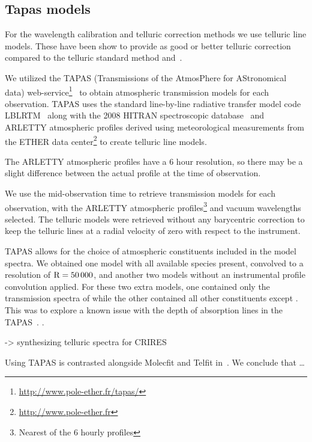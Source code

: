 \subsection{Tapas models}
\label{subsec:tapas_models}
For the wavelength calibration and telluric correction methods we use telluric line models.
These have been show to provide as good or better telluric correction compared to the telluric standard method and~\citep{ulmer-moll_telluric_2018}.

We utilized the {TAPAS} (Transmissions of the AtmosPhere for AStronomical data) web-service\footnote{\href{http://www.pole-ether.fr/tapas/}{http://www.pole-ether.fr/tapas/}}~\citep{bertaux_tapas_2014} to obtain atmospheric transmission models for each observation. {TAPAS} uses the standard line-by-line radiative transfer model code LBLRTM~\citep{clough_linebyline_1995} along with the 2008 {HITRAN} spectroscopic database~\citep{rothman_hitran_2009} and {ARLETTY} atmospheric profiles derived using meteorological measurements from the {ETHER} data center\footnote{\href{http://www.pole-ether.fr}{http://www.pole-ether.fr}} to create telluric line models.

The {ARLETTY} atmospheric profiles have a 6 hour resolution, so there may be a slight difference between the actual profile at the time of observation.

We use the mid-observation time to retrieve transmission models for each observation, with the {ARLETTY} atmospheric profiles\footnote{Nearest of the 6 hourly profiles} and vacuum wavelengths selected.
The telluric models were retrieved without any barycentric correction to keep the telluric lines at a radial velocity of zero with respect to the instrument.

{TAPAS} allows for the choice of atmospheric constituents included in the model spectra.
We obtained one model with all available species present, convolved to a resolution of \(\rm R=50\,000\), and another two models without an instrumental profile convolution applied.
For these two extra models, one contained only the transmission spectra of  while the other contained all other constituents except .
This was to explore a known issue with the depth of  absorption lines in the TAPAS~\citet{bertaux_tapas_2014}. .


 -> synthesizing telluric spectra \nir{} for {CRIRES}~\cite{seifahrt_synthesising_2010}

Using {TAPAS} is contrasted alongside Molecfit and Telfit in~\cite{ulmer-moll_telluric_2018}.
We conclude that \ldots
